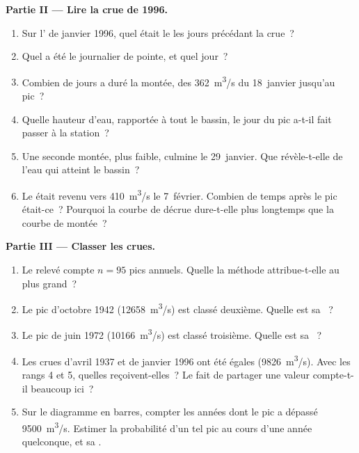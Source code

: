 \begin{problem}
\medskip
\noindent\textbf{Partie II --- Lire la crue de 1996.}
\begin{enumerate}[resume]
  \item Sur l' de janvier 1996, quel était le  les
        jours précédant la crue~?
  \item Quel a été le  journalier de pointe, et quel jour~?
  \item Combien de jours a duré la montée, des \qty{362}{m^3/s} du
        18~janvier jusqu'au pic~?
  \item Quelle hauteur d'eau, rapportée à tout le bassin, le jour du pic
        a-t-il fait passer à la station~?
  \item Une seconde montée, plus faible, culmine le 29~janvier. Que
        révèle-t-elle de l'eau qui atteint le bassin~?
  \item Le  était revenu vers \qty{410}{m^3/s} le 7~février. Combien
        de temps après le pic était-ce~? Pourquoi la courbe de décrue
        dure-t-elle plus longtemps que la courbe de montée~?
\end{enumerate}

\medskip
\noindent\textbf{Partie III --- Classer les crues.}
\begin{enumerate}[resume]
  \item Le relevé compte $n = 95$ pics annuels. Quelle  la
        méthode attribue-t-elle au plus grand~?
  \item Le pic d'octobre 1942 (\qty{12658}{m^3/s}) est classé deuxième.
        Quelle est sa ~?
  \item Le pic de juin 1972 (\qty{10166}{m^3/s}) est classé troisième.
        Quelle est sa ~?
  \item Les crues d'avril 1937 et de janvier 1996 ont été égales
        (\qty{9826}{m^3/s}). Avec les rangs 4 et 5, quelles  reçoivent-elles~? Le fait de partager une valeur compte-t-il
        beaucoup ici~?
  \item Sur le diagramme en barres, compter les années dont le pic a
        dépassé \qty{9500}{m^3/s}. Estimer la probabilité d'un tel pic au
        cours d'une année quelconque, et sa .
\end{enumerate}


\end{problem}
